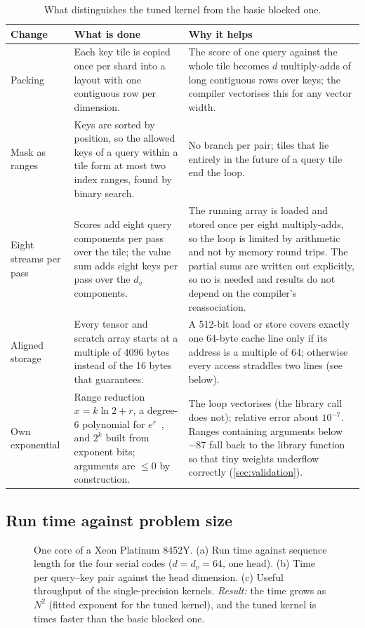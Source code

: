 \begin{table}[t]
\centering\small
\begin{tabularx}{\textwidth}{@{}l Y Y@{}}
\toprule
Change & What is done & Why it helps\\
\midrule
Packing & Each key tile is copied once per shard into a layout with one contiguous row per dimension. & The score of one query against the whole tile becomes $d$ multiply-adds of long contiguous rows over keys; the compiler vectorises this for any vector width.\\
Mask as ranges & Keys are sorted by position, so the allowed keys of a query within a tile form at most two index ranges, found by binary search. & No branch per pair; tiles that lie entirely in the future of a query tile end the loop.\\
Eight streams per pass & Scores add eight query components per pass over the tile; the value sum adds eight keys per pass over the $d_v$ components. & The running array is loaded and stored once per eight multiply-adds, so the loop is limited by arithmetic and not by memory round trips. The partial sums are written out explicitly, so no  is needed and results do not depend on the compiler's reassociation.\\
Aligned storage & Every tensor and scratch array starts at a multiple of 4096 bytes instead of the 16 bytes that  guarantees. & A 512-bit load or store covers exactly one 64-byte cache line only if its address is a multiple of 64; otherwise every access straddles two lines (see below).\\
Own exponential & Range reduction $x=k\ln2+r$, a degree-6 polynomial for $e^{r}$~\cite{cephes}, and $2^k$ built from exponent bits; arguments are $\le 0$ by construction. & The loop vectorises (the library call does not); relative error about $10^{-7}$. Ranges containing arguments below $-87$ fall back to the library function so that tiny weights underflow correctly (\cref{sec:validation}).\\
\bottomrule
\end{tabularx}
\caption{What distinguishes the tuned kernel from the basic blocked one.}
\label{tab:tuning}
\end{table}

\subsection{Run time against problem size}
\begin{figure}[t]
\centering
{}
\caption{One core of a Xeon Platinum 8452Y. (a) Run time against sequence length
for the four serial codes ($d=d_v=64$, one head). (b) Time per query--key pair
against the head dimension. (c) Useful throughput of the single-precision kernels.
\emph{Result:} the time grows as $N^2$ (fitted exponent  for the tuned
kernel), and the tuned kernel is  times faster than the
basic blocked one.}
\label{fig:serial}
\end{figure}

